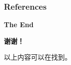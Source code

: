 
\begin{frame}[allowframebreaks]
\frametitle{References}

{\footnotesize


}

\end{frame}


\begin{frame}

{\Huge{\centerline{\bfseries The End}}}

\vspace{0.5em}

{\Huge{\centerline{\phantom{a}\bfseries 谢谢！}}}

\vfill

\noindent 以上内容可以在\href{https://github.com/wenh06/fl_seminar}{}找到。

\end{frame}



